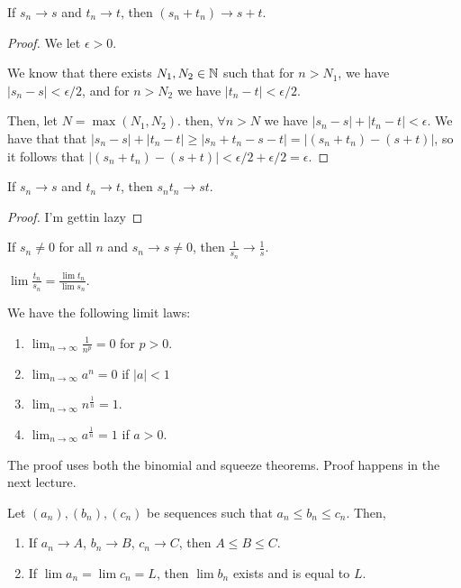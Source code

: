\documentclass{book}
\begin{document}
\begin{thm}
    If $s_n \to s$ and $t_n \to t$, then $(s_n + t_n) \to s + t$.
\end{thm}

\begin{proof}
    We let $\epsilon > 0$.

    We know that there exists $N_1, N_2 \in \mathbb{N}$ such that for $n > N_1$, we have $|s_n - s| < \epsilon / 2$, and for $n > N_2$ we have $|t_n - t| < \epsilon / 2$. 

    Then, let $N = \max(N_1, N_2)$. then, $\forall n > N$ we have $|s_n - s| + |t_n - t| < \epsilon$. We have that that $|s_n - s| + |t_n - t| \geq |s_n + t_n - s - t| = |(s_n + t_n) - (s + t)|$, so it follows that $|(s_n + t_n) - (s + t)| < \epsilon / 2 + \epsilon / 2 = \epsilon$.
\end{proof}

\begin{thm}
    If $s_n \to s$ and $t_n \to t$, then $s_nt_n \to st$.
\end{thm}

\begin{proof}
    I'm gettin lazy 
\end{proof}

\begin{lemma}
    If $s_n \neq 0$ for all $n$ and $s_n \to s \neq 0$, then $\frac{1}{s_n} \to \frac{1}{s}$. 
\end{lemma}

\begin{thm}
    $\lim \frac{t_n}{s_n} = \frac{\lim t_n}{\lim s_n}$.
\end{thm}

\begin{thm}
    We have the following limit laws:
    \begin{enumerate}[label=(\alph*)]
        \item $\lim_{n \to \infty} \frac{1}{n^p} = 0$ for $p > 0$.
        \item $\lim_{n \to \infty} a^n = 0$ if $|a| < 1$
        \item $\lim_{n \to \infty} n^\frac{1}{n} = 1$.
        \item $\lim_{n \to \infty} a^{\frac{1}{n}} = 1$ if $a > 0$.
    \end{enumerate}
\end{thm}

The proof uses both the binomial and squeeze theorems. Proof happens in the next lecture.

\begin{thm}
    Let $(a_n), (b_n), (c_n)$ be sequences such that $a_n \leq b_n \leq c_n$. Then,
    \begin{enumerate}
        \item If $a_n \to A$, $b_n \to B$, $c_n \to C$, then $A \leq B \leq C$. 
        \item If $\lim a_n = \lim c_n = L$, then $\lim b_n$ exists and is equal to $L$.
    \end{enumerate}
\end{thm}
\end{document}
